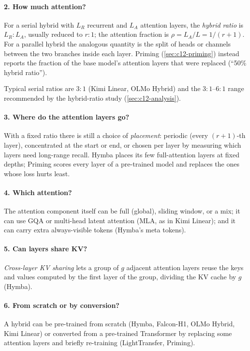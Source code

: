\paragraph{2. How much attention?}
\begin{definition}\label{def:c12-ratio}
For a serial hybrid with $L_R$ recurrent and $L_A$ attention layers, the \emph{hybrid ratio} is
$L_R{:}L_A$, usually reduced to $r{:}1$; the attention fraction is $\rho = L_A/L = 1/(r+1)$.
For a parallel hybrid the analogous quantity is the split of heads or channels between the two
branches inside each layer. Priming (\cref{sec:c12-priming}) instead reports the fraction of the
base model's attention layers that were replaced (``50\% hybrid ratio'').
\end{definition}
Typical serial ratios are $3{:}1$ (Kimi Linear, OLMo Hybrid) and the $3{:}1$--$6{:}1$ range
recommended by the hybrid-ratio study (\cref{sec:c12-analysis}).

\paragraph{3. Where do the attention layers go?} With a fixed ratio there is still a choice of
\emph{placement}: periodic (every $(r+1)$-th layer), concentrated at the start or end, or chosen
per layer by measuring which layers need long-range recall. Hymba places its few full-attention
layers at fixed depths; Priming scores every layer of a pre-trained model and replaces the ones
whose loss hurts least.

\paragraph{4. Which attention?} The attention component itself can be full (global), sliding
window, or a mix; it can use GQA or multi-head latent attention (MLA, as in Kimi Linear); and it
can carry extra always-visible tokens (Hymba's meta tokens).

\paragraph{5. Can layers share KV?} \emph{Cross-layer KV sharing} lets a group of $g$ adjacent
attention layers reuse the keys and values computed by the first layer of the group, dividing
the KV cache by $g$ (Hymba).

\paragraph{6. From scratch or by conversion?} A hybrid can be pre-trained from scratch
(Hymba, Falcon-H1, OLMo Hybrid, Kimi Linear) or converted from a pre-trained Transformer by
replacing some attention layers and briefly re-training (LightTransfer, Priming).

